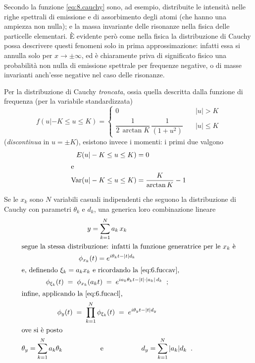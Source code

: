 Secondo la funzione \eqref{eq:8.cauchy} sono, ad esempio,
distribuite le intensit\`a nelle righe spettrali di
emissione e di assorbimento degli atomi (che hanno una
ampiezza non nulla); e la massa invariante delle risonanze
nella fisica delle particelle elementari.  \`E evidente
per\`o come nella fisica la distribuzione di Cauchy possa
descrivere questi fenomeni solo in prima approssimazione:
infatti essa si annulla solo per $x \to \pm \infty$, ed \`e
chiaramente priva di significato fisico una probabilit\`a
non nulla di emissione spettrale per frequenze negative, o
di masse invarianti anch'esse negative nel caso delle
risonanze.

Per la distribuzione di Cauchy \emph{troncata}, ossia quella
descritta dalla funzione di frequenza (per la variabile
standardizzata)
\begin{equation*}
  f(u | -K \le u \le K) =
  \begin{cases}
    0 & \quad |u| > K \\[1ex]
    \dfrac{1}{2 \, \arctan K} \, \dfrac{1}{\left( 1 + u^2
      \right)} & \quad |u| \le K
  \end{cases}
\end{equation*}
(\emph{discontinua} in $u = \pm K$), esistono invece i
momenti: i primi due valgono
\begin{align*}
  E(u | -K \le u \le K) &= 0 \\
  \intertext{e}
  \operatorname{Var}(u | -K \le u \le K) &= \frac{K}{\arctan K} - 1
\end{align*}

%
Se le $x_k$ sono $N$ variabili casuali indipendenti che
seguono la distribuzione di Cauchy con parametri $\theta_k$
e $d_k$, una generica loro combinazione lineare
\begin{gather*}
  y = \sum_{k=1}^N a_k \, x_k \\
  \intertext{segue la stessa distribuzione: infatti la
    funzione generatrice per le $x_k$ \`e}
  \phi_{x_k} (t) = e^{ i \theta_k t - |t| d_k } \\
  \intertext{e, definendo $\xi_k = a_k x_k$ e ricordando la
    \eqref{eq:6.fuccav},}
  \phi_{\xi_k} (t) \; = \; \phi_{x_k} (a_k t) \; = \; e^{ i
    a_k \theta_k t - |t| \cdot | a_k | \, d_k } \peq ; \\
  \intertext{infine, applicando la \eqref{eq:6.fucacl},}
  \phi_y (t) \; = \; \prod_{k=1}^N \phi_{\xi_k} (t) \; = \;
  e^{ i \theta_y t - |t| d_y } \\
  \intertext{ove si \`e posto}
  \theta_y = \sum_{k=1}^N a_k \theta_k
  \makebox[40mm]{e}
  d_y = \sum_{k=1}^N |a_k| d_k \peq .
\end{gather*}%


